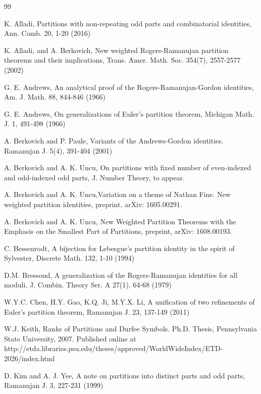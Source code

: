 \documentclass[11pt]{article}
\begin{document}
\begin{thebibliography}{99}

 K. Alladi, Partitions with non-repeating odd parts and combinatorial identities, Ann. Comb. 20, 1-20 (2016)

 K. Alladi, and A. Berkovich, New weighted Rogers-Ramanujan partition theorems and their implications, Trans. Amer. Math. Soc. 354(7),  2557-2577 (2002)

 G. E. Andrews, An analytical proof of the Rogers-Ramanujan-Gordon identities, Am. J. Math. 88,  844-846 (1966)    

 G. E. Andrews, On generalizations of Euler's partition theorem, Michigan Math. J. 1, 491-498 (1966)

 A. Berkovich and P. Paule, Variants of the Andrews-Gordon identities. Ramanujan J. 5(4), 391-404 (2001)


 A. Berkovich and A. K. Uncu, On partitions with fixed number of even-indexed and odd-indexed odd parts, J. Number Theory, to appear.


 A. Berkovich and A. K. Uncu,Variation on a theme of Nathan Fine. New weighted partition identities, preprint, arXiv: 1605.00291.


 A. Berkovich and A. K. Uncu, New Weighted Partition Theorems with the Emphasis on the Smallest Part of Partitions, preprint, arXiv: 1608.00193.


 C. Bessenrodt, A bijection for Lebesgue's partition identity in the spirit of Sylvester, Discrete Math.  132, 1-10 (1994)



 D.M. Bressoud, A generalization of the Rogers-Ramanujan identities for all moduli, J. Combin. Theory Ser. A 27(1), 64-68 (1979)

 W.Y.C. Chen, H.Y. Gao, K.Q. Ji, M.Y.X. Li, A unification of two refinements of Euler's partition theorem, Ramanujan J. 23, 137-149 (2011)

 W.J. Keith, Ranks of Partitions and Durfee Symbols. Ph.D. Thesis, Pennsylvania State University, 2007. Published online at http://etda.libraries.psu.edu/theses/approved/WorldWideIndex/ETD-2026/index.html

 D. Kim and A. J. Yee, A note on partitions into distinct parts and odd parts, Ramanujan J. 3, 227-231 (1999)


\end{thebibliography}
\end{document}
